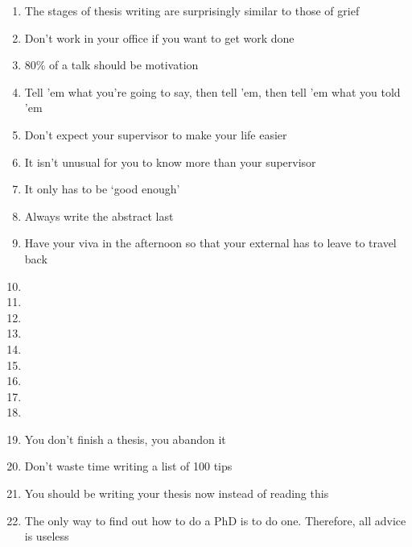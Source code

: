 \begin{enumerate}
	\item The stages of thesis writing are surprisingly similar to those of grief
	\item Don't work in your office if you want to get work done 
	\item 80\% of a talk should be motivation
	\item Tell 'em what you're going to say, then tell 'em, then tell 'em what you told 'em
	\item Don't expect your supervisor to make your life easier
	\item It isn't unusual for you to know more than your supervisor
	\item It only has to be `good enough'
	\item Always write the abstract last
	\item Have your viva in the afternoon so that your external has to leave to travel back
	\item
	\item
	\item
	\item
	\item
	\item
	\item
	\item
	\item
	\item You don't finish a thesis, you abandon it 
	\item Don't waste time writing a list of 100 tips
	\item You should be writing your thesis now instead of reading this
	\item The only way to find out how to do a PhD is to do one. Therefore, all advice is useless\cite{richardbutterworth}
\end{enumerate}